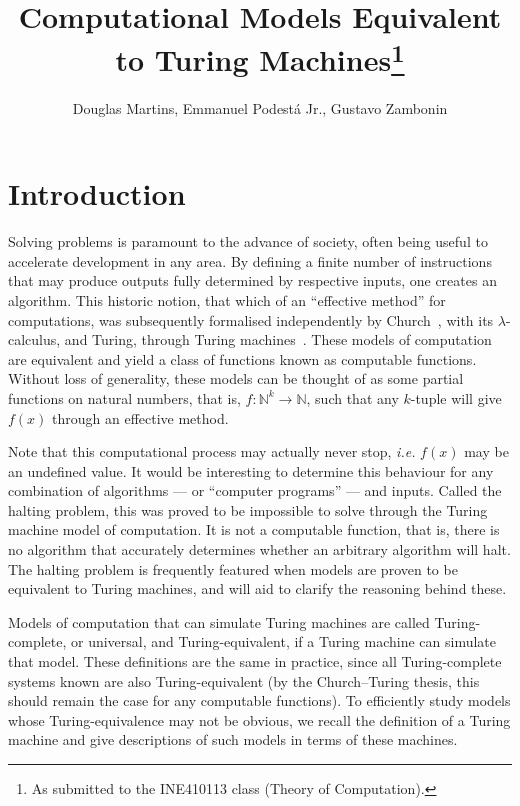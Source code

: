 \documentclass[12pt]{article}
\title{Computational Models Equivalent to Turing Machines\footnote{
    As submitted to the INE410113 class (Theory of Computation).}}
\author{Douglas Martins\inst{1}, Emmanuel Podestá Jr.\inst{1}, Gustavo Zambonin\inst{1}}
\begin{document}
 

\maketitle

\section{Introduction}\label{sec:intro}
 
Solving problems is paramount to the advance of society, often being useful to accelerate development in any area. By defining a finite number of instructions that may produce outputs fully determined by respective inputs, one creates an algorithm. This historic notion, that which of an ``effective method'' for computations, was subsequently formalised independently by Church~\cite{Church:article:1936:apr}, with its $\lambda$-calculus, and Turing, through Turing machines~\cite{Turing:article:1937:jan}. These models of computation are equivalent and yield a class of functions known as computable functions. Without loss of generality, these models can be thought of as some partial functions on natural numbers, that is, $f : \mathbb{N}^{k} \rightarrow \mathbb{N}$, such that any $k$-tuple will give $f(x)$ through an effective method. 

Note that this computational process may actually never stop, \emph{i.e.} $f(x)$ may be an undefined value. It would be interesting to determine this behaviour for any combination of algorithms --- or ``computer programs'' --- and inputs. Called the halting problem, this was proved to be impossible to solve through the Turing machine model of computation. It is not a computable function, that is, there is no algorithm that accurately determines whether an arbitrary algorithm will halt. The halting problem is frequently featured when models are proven to be equivalent to Turing machines, and will aid to clarify the reasoning behind these.

Models of computation that can simulate Turing machines are called Turing-complete, or universal, and Turing-equivalent, if a Turing machine can simulate that model. These definitions are the same in practice, since all Turing-complete systems known are also Turing-equivalent (by the Church--Turing thesis, this should remain the case for any computable functions). To efficiently study models whose Turing-equivalence may not be obvious, we recall the definition of a Turing machine and give descriptions of such models in terms of these machines.
\end{document}
